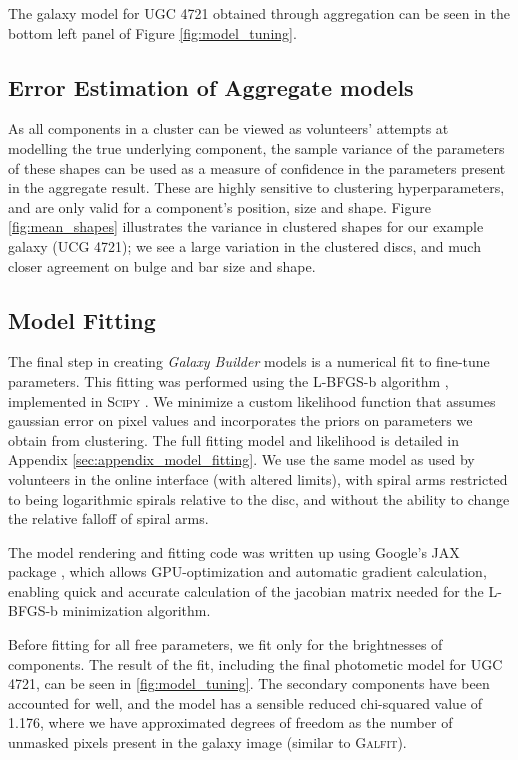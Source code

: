 \documentclass[../main.tex]{subfiles}
\begin{document}
The galaxy model for UGC 4721 obtained through aggregation can be seen in the bottom left panel of Figure \ref{fig:model_tuning}.


\subsection{Error Estimation of Aggregate models}
\label{sec:error_estimation}

As all components in a cluster can be viewed as volunteers' attempts at modelling the true underlying component, the sample variance of the parameters of these shapes can be used as a measure of confidence in the parameters present in the aggregate result. These are highly sensitive to clustering hyperparameters, and are only valid for a component's position, size and shape. Figure \ref{fig:mean_shapes} illustrates the variance in clustered shapes for our example galaxy (UCG 4721); we see a large variation in the clustered discs, and much closer agreement on bulge and bar size and shape.

\subsection{Model Fitting}


The final step in creating \textit{Galaxy Builder} models is a numerical fit to fine-tune parameters. This fitting was performed using the L-BFGS-b algorithm \citep{doi:10.1137/0916069}, implemented in \textsc{Scipy} \citep{scipy-paper}. We minimize a custom likelihood function that assumes gaussian error on pixel values and incorporates the priors on parameters we obtain from clustering. The full fitting model and likelihood is detailed in Appendix \ref{sec:appendix_model_fitting}. We use the same model as used by volunteers in the online interface (with altered limits), with spiral arms restricted to being logarithmic spirals relative to the disc, and without the ability to change the relative falloff of spiral arms.

The model rendering and fitting code was written up using Google's JAX package \citep{jax2018github}, which allows GPU-optimization and automatic gradient calculation, enabling quick and accurate calculation of the jacobian matrix needed for the L-BFGS-b minimization algorithm.

Before fitting for all free parameters, we fit only for the brightnesses of components. The result of the fit, including the final photometic model for UGC 4721, can be seen in \ref{fig:model_tuning}. The secondary components have been accounted for well, and the model has a sensible reduced chi-squared value of 1.176, where we have approximated degrees of freedom as the number of unmasked pixels present in the galaxy image (similar to \textsc{Galfit}).
\end{document}
